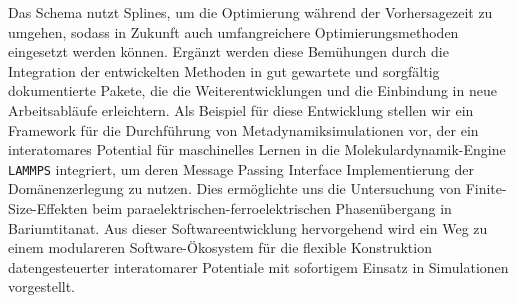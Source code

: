 Das Schema nutzt Splines, um die Optimierung während der Vorhersagezeit zu umgehen, sodass in Zukunft auch umfangreichere Optimierungsmethoden eingesetzt werden können.  Ergänzt werden diese Bemühungen durch die Integration der entwickelten Methoden in gut gewartete und sorgfältig dokumentierte Pakete, die die Weiterentwicklungen und die Einbindung in neue Arbeitsabläufe erleichtern.  Als Beispiel für diese Entwicklung stellen wir ein Framework für die Durchführung von Metadynamiksimulationen vor, der ein interatomares Potential für maschinelles Lernen in die Molekulardynamik-Engine \texttt{LAMMPS} integriert, um deren Message Passing Interface Implementierung der Domänenzerlegung zu nutzen.  Dies ermöglichte uns die Untersuchung von Finite-Size-Effekten beim paraelektrischen-ferroelektrischen Phasenübergang in Bariumtitanat.
Aus dieser Softwareentwicklung hervorgehend wird ein Weg zu einem modulareren Software-Ökosystem für die flexible Konstruktion datengesteuerter interatomarer Potentiale mit sofortigem Einsatz in Simulationen vorgestellt.
%
%
%
%

\newpage

